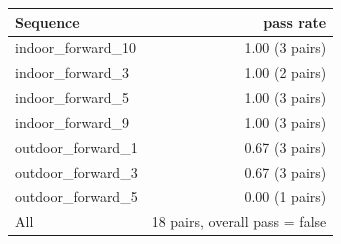 \begin{tabular}{lr}
\toprule
Sequence & pass rate \\
\midrule
indoor\_forward\_10 & 1.00 (3 pairs) \\
indoor\_forward\_3 & 1.00 (2 pairs) \\
indoor\_forward\_5 & 1.00 (3 pairs) \\
indoor\_forward\_9 & 1.00 (3 pairs) \\
outdoor\_forward\_1 & 0.67 (3 pairs) \\
outdoor\_forward\_3 & 0.67 (3 pairs) \\
outdoor\_forward\_5 & 0.00 (1 pairs) \\
\midrule
All & 18 pairs, overall pass = false \\
\bottomrule
\end{tabular}
